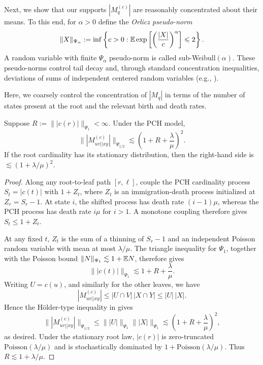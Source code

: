 Next, we show that our supports $|M_q^{(c)}|$ are reasonably concentrated about their means.
To this end, for $\alpha>0$ define the \emph{Orlicz pseudo-norm}
%
\[\|X\|_{\Psi_\alpha}:=\inf\left\{c>0:\mathbb{E}\exp\left[\left(\frac{|X|}{c}\right)^\alpha\right]\leqslant2\right\}.\]
%
\noindent A random variable with finite $\Psi_\alpha$ pseudo-norm is called
sub-Weibull$(\alpha)$. These pseudo-norms control tail decay and, through standard
concentration inequalities, deviations of sums of independent centered random variables
(e.g., \cite[Theorem~3.1]{kuchibhotla2022_beyond_sub_gaussian_high_dimensional_statistics}).

Here, we coarsely control the concentration of $|M_q|$ in terms of the number of states present at the root
and the relevant birth and death rates.

\begin{lemma}
\label{lem:pch_subweibull_quartet_supports}
    Suppose $R:=\bigl\||c(r)|\bigr\|_{\Psi_1}<\infty$. Under the PCH model,
    \[\bigl\||M_{uv||xy}^{(c)}|\bigr\|_{\Psi_{1/2}}
    \lesssim \left(1+R+\frac{\lambda}{\mu}\right)^2.\]
    \noindent If the root cardinality has its stationary distribution, then the right-hand side is
    $\lesssim(1+\lambda/\mu)^2$.
\end{lemma}

\begin{proof}
    Along any root-to-leaf path $[r, \ell]$, couple the PCH cardinality process $S_t=|c(t)|$
    with $1+Z_t$, where $Z_t$ is an immigration-death process initialized at
    $Z_r=S_r-1$. At state $i$, the shifted process has death rate $(i-1)\mu$,
    whereas the PCH process has death rate $i\mu$ for $i>1$. A monotone coupling
    therefore gives $S_t\leq1+Z_t$.

    At any fixed $t$, $Z_t$ is the sum of a thinning of $S_r-1$ and an independent
    Poisson random variable with mean at most $\lambda/\mu$. The triangle inequality
    for $\Psi_1$, together with the Poisson bound
    $\|N\|_{\Psi_1}\lesssim1+\mathbb{E} N$, therefore gives
    \[\bigl\||c(t)|\bigr\|_{\Psi_1}\lesssim
    1+R+\frac{\lambda}{\mu}.\]
    Writing $U=c(u)$, and similarly for the other leaves, we have
    \[|M_{uv||xy}^{(c)}|\leq |U\cap V|\,|X\cap Y|\leq |U|\,|X|.\]
    \noindent Hence the H\"older-type inequality in
    \cite[equation~(3.5)]{kuchibhotla2022_beyond_sub_gaussian_high_dimensional_statistics}
    gives
    \[\bigl\||M_{uv||xy}^{(c)}|\bigr\|_{\Psi_{1/2}}
    \leq \bigl\||U|\bigr\|_{\Psi_1}\bigl\||X|\bigr\|_{\Psi_1}
    \lesssim\left(1+R+\frac{\lambda}{\mu}\right)^2,\]
    \noindent as desired. Under the stationary root law, $|c(r)|$ is zero-truncated
    $\mathrm{Poisson}(\lambda/\mu)$ and is stochastically dominated by
    $1+\mathrm{Poisson}(\lambda/\mu)$. Thus $R\lesssim1+\lambda/\mu$.
\end{proof}

